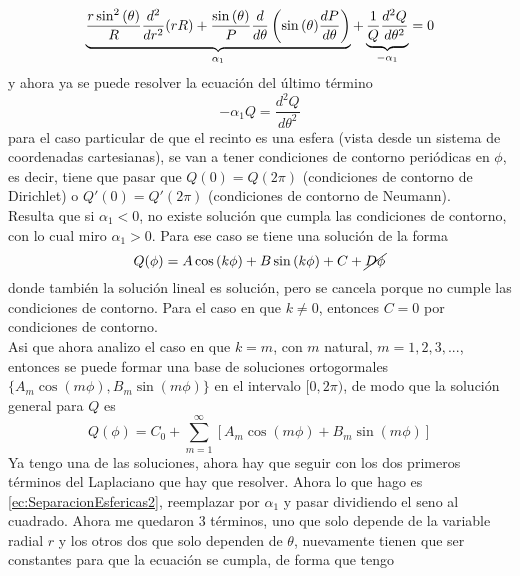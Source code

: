 \begin{equation}
    \underbrace%
    {
        \frac{r\sin^{2}{(\theta)}}{R}
        \frac{d^{2}}{dr^{2}}(rR)
        +
        \frac{\sin{(\theta)}}{P}
        \frac{d}{d\theta}
        \left(
            \sin{(\theta)}\frac{dP}{d\theta}
        \right)
    }_{\alpha_{1}}
        +
    \underbrace%
    {%
        \frac{1}{Q}
        \frac{d^{2}Q}{d\theta^{2}}
    }_{-\alpha_{1}}
    = 0
        \label{ec:SeparacionEsfericas2}
\end{equation}
y ahora ya se puede resolver la ecuación del último término
\begin{equation*}
    -\alpha_{1}Q = \frac{d^{2}Q}{d\theta^{2}}
\end{equation*}
para el caso particular de que el recinto es una esfera (vista desde un sistema de coordenadas cartesianas), se van a tener condiciones de contorno periódicas en $\phi$, es decir, tiene que pasar que $Q(0) = Q(2\pi)$ (condiciones de contorno de Dirichlet) o $Q'(0) = Q'(2\pi)$ (condiciones de contorno de Neumann).\\
\indent Resulta que si $\alpha_{1}<0$, no existe solución que cumpla las condiciones de contorno, con lo cual miro $\alpha_{1}>0$. Para ese caso se tiene una solución de la forma
\begin{equation*}
    Q(\phi) 
    = A\cos{(k\phi)} 
    + B\sin{(k\phi)} 
    + C 
    + \cancel{D\phi}
\end{equation*}
donde también la solución lineal es solución, pero se cancela porque no cumple las condiciones de contorno. Para el caso en que $k \neq 0$, entonces $C = 0$ por condiciones de contorno.\\
\indent Asi que ahora analizo el caso en que $k = m$, con $m$ natural, $m = 1,2,3,...$, entonces se puede formar una base de soluciones ortogormales $\{ A_{m}\cos{(m\phi)}, B_{m}\sin{(m\phi)} \}$ en el intervalo $[0,2\pi)$, de modo que la solución general para $Q$ es
\begin{equation*}
    Q(\phi) = C_{0} 
    + \sum\limits_{m = 1}^{\infty}
    \left[
        A_{m}\cos{(m\phi)}
        +
        B_{m}\sin{(m\phi)}
    \right]
\end{equation*}
Ya tengo una de las soluciones, ahora hay que seguir con los dos primeros términos del Laplaciano que hay que resolver. Ahora lo que hago es \eqref{ec:SeparacionEsfericas2}, reemplazar por $\alpha_{1}$ y pasar dividiendo el seno al cuadrado. Ahora me quedaron 3 términos, uno que solo depende de la variable radial $r$ y los otros dos que solo dependen de $\theta$, nuevamente tienen que ser constantes para que la ecuación se cumpla, de forma que tengo 
